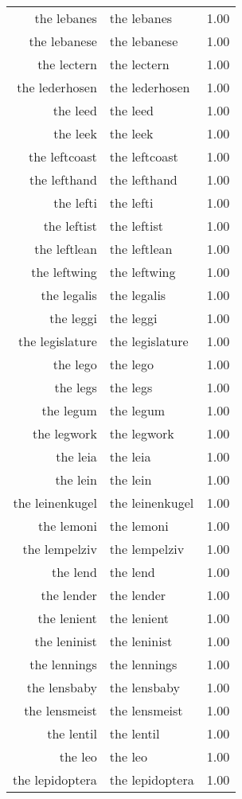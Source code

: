 \begin{table}[ht]
\begin{tabular}{rlr}
  the lebanes & the lebanes & 1.00 \\ 
  the lebanese & the lebanese & 1.00 \\ 
  the lectern & the lectern & 1.00 \\ 
  the lederhosen & the lederhosen & 1.00 \\ 
  the leed & the leed & 1.00 \\ 
  the leek & the leek & 1.00 \\ 
  the leftcoast & the leftcoast & 1.00 \\ 
  the lefthand & the lefthand & 1.00 \\ 
  the lefti & the lefti & 1.00 \\ 
  the leftist & the leftist & 1.00 \\ 
  the leftlean & the leftlean & 1.00 \\ 
  the leftwing & the leftwing & 1.00 \\ 
  the legalis & the legalis & 1.00 \\ 
  the leggi & the leggi & 1.00 \\ 
  the legislature & the legislature & 1.00 \\ 
  the lego & the lego & 1.00 \\ 
  the legs & the legs & 1.00 \\ 
  the legum & the legum & 1.00 \\ 
  the legwork & the legwork & 1.00 \\ 
  the leia & the leia & 1.00 \\ 
  the lein & the lein & 1.00 \\ 
  the leinenkugel & the leinenkugel & 1.00 \\ 
  the lemoni & the lemoni & 1.00 \\ 
  the lempelziv & the lempelziv & 1.00 \\ 
  the lend & the lend & 1.00 \\ 
  the lender & the lender & 1.00 \\ 
  the lenient & the lenient & 1.00 \\ 
  the leninist & the leninist & 1.00 \\ 
  the lennings & the lennings & 1.00 \\ 
  the lensbaby & the lensbaby & 1.00 \\ 
  the lensmeist & the lensmeist & 1.00 \\ 
  the lentil & the lentil & 1.00 \\ 
  the leo & the leo & 1.00 \\ 
  the lepidoptera & the lepidoptera & 1.00 \\ 

\end{tabular}
\end{table}
